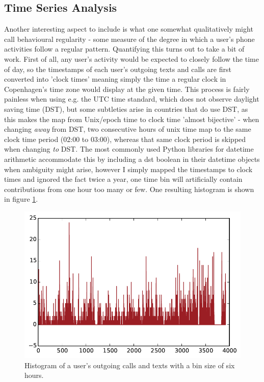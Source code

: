 \FloatBarrier
\subsection{Time Series Analysis}
\label{sec:ar}
Another interesting aspect to include is what one somewhat qualitatively might call behavioural regularity - some measure of the degree in which a user's phone activities follow a regular pattern. Quantifying this turns out to take a bit of work. First of all, any user's activity would be expected to closely follow the time of day, so the timestamps of each user's outgoing texts and calls are first converted into 'clock times' meaning simply the time a regular clock in Copenhagen's time zone would display at the given time. This process is fairly painless when using e.g. the UTC time standard, which does not observe daylight saving time (DST), but some subtleties arise in countries that do use DST, as this makes the map from Unix/epoch time to clock time 'almost bijective' - when changing \emph{away} from DST, two consecutive hours of unix time map to the same clock time period (02:00 to 03:00), whereas that same clock period is skipped when changing \emph{to} DST. The most commonly used Python libraries for datetime arithmetic accommodate this by including a dst boolean in their datetime objects when ambiguity might arise, however I simply mapped the timestamps to clock times and ignored the fact twice a year, one time bin will artificially contain contributions from one hour too many or few. One resulting histogram is shown in figure \ref{fig:ar_histogram_raw}.  %
\begin{figure}
	\centering
	\includegraphics[width = \figwidth]{pics/dtu/ar_signal_example.pdf}
	\caption{Histogram of a user's outgoing calls and texts with a bin size of six hours.}
	\label{fig:ar_histogram_raw}
\end{figure}

